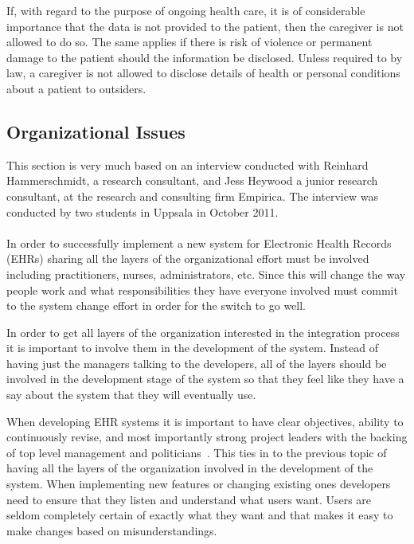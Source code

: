 \documentclass[14pt]{article}
\begin{document}
If, with regard to the purpose of ongoing health care, it is of considerable importance that the data is not provided to the patient, then the caregiver is not allowed to do so. The same applies if there is risk of violence or permanent damage to the patient should the information be disclosed. Unless required to by law, a caregiver is not allowed to disclose details of health or personal conditions about a patient to outsiders.\cite{PatientSafetyAct}

\subsection{Organizational Issues}
\label{sec:futureOrganizational}
This section is very much based on an interview conducted with Reinhard Hammerschmidt, a research consultant, and Jess Heywood a junior research consultant, at the research and consulting firm Empirica. The interview was conducted by two students in Uppsala in October 2011.
\\\\
In order to successfully implement a new system for Electronic Health Records (\glspl{EHR}) sharing all the layers of the organizational effort must be involved including practitioners, nurses, administrators, etc. Since this will change the way people work and what responsibilities they have everyone involved must commit to the system change effort in order for the switch to go well.

In order to get all layers of the organization interested in the integration process it is important to involve them in the development of the system. Instead of having just the managers talking to the developers, all of the layers should be involved in the development stage of the system so that they feel like they have a say about the system that they will eventually use.

When developing \gls{EHR} systems it is important to have clear objectives, ability to continuously revise, and most importantly strong project leaders with the backing of top level management and politicians~\cite{Empirica}. This ties in to the previous topic of having all the layers of the organization involved in the development of the system. When implementing new features or changing existing ones developers need to ensure that they listen and understand what users want. Users are seldom completely certain of exactly what they want and that makes it easy to make changes based on misunderstandings.
\end{document}
